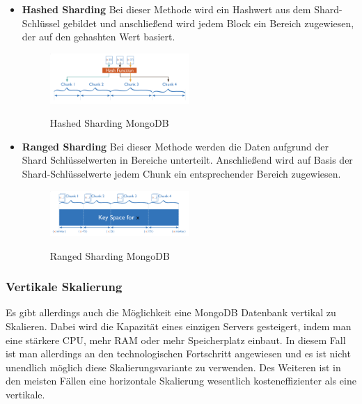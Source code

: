 \begin{itemize}
    \item \textbf{Hashed Sharding}
        \newline
        Bei dieser Methode wird ein Hashwert aus dem Shard-Schlüssel gebildet und anschließend wird jedem Block ein Bereich zugewiesen, der auf den gehashten Wert basiert.
        \begin{figure}[h!]
            \centering
            \includegraphics[width=0.5\textwidth]{pics/hashed_sharding.png}
            \caption{Hashed Sharding MongoDB}
            \cite{hashed_sharding_image}
            \label{fig:enter-label}
        \end{figure}
    \item \textbf{Ranged Sharding}
        \newline
        Bei dieser Methode werden die Daten aufgrund der Shard Schlüsselwerten in Bereiche unterteilt. Anschließend wird auf Basis der Shard-Schlüsselwerte jedem Chunk ein entsprechender Bereich zugewiesen.
        \begin{figure}[h!]
            \centering
            \includegraphics[width=0.5\textwidth]{pics/ranged_sharding.png}
            \caption{Ranged Sharding MongoDB}
            \cite{range_sharding_image}
            \label{fig:enter-label}
        \end{figure}
\end{itemize}

\subsubsection{Vertikale Skalierung}
Es gibt allerdings auch die Möglichkeit eine MongoDB Datenbank vertikal zu Skalieren. Dabei wird die Kapazität eines einzigen Servers gesteigert, indem man eine stärkere CPU, mehr RAM oder mehr Speicherplatz einbaut. In diesem Fall ist man allerdings an den technologischen Fortschritt angewiesen und es ist nicht unendlich möglich diese Skalierungsvariante zu verwenden. Des Weiteren ist in den meisten Fällen eine horizontale Skalierung wesentlich kosteneffizienter als eine vertikale.
\cite{mongodb_sharding}

